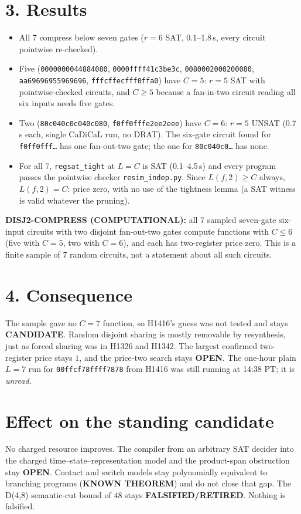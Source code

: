 \documentclass[11pt]{article}
\begin{document}
\section*{3. Results}
\begin{itemize}
\item All 7 compress below seven gates ($r=6$ SAT, 0.1--1.8\,s, every circuit pointwise re-checked).
\item Five (\texttt{0000000044884080}, \texttt{0000ffff41c3be3c}, \texttt{0080002000200080}, \texttt{aa69696955969696}, \texttt{fffcffecfff0ffa0}) have $C=5$: $r=5$ SAT with pointwise-checked circuits, and $C\ge5$ because a fan-in-two circuit reading all six inputs needs five gates.
\item Two (\texttt{80c040c0c040c080}, \texttt{f0ff0fffe2ee2eee}) have $C=6$: $r=5$ UNSAT (0.7\,s each, single CaDiCaL run, no DRAT). The six-gate circuit found for \texttt{f0ff0fff\ldots} has one fan-out-two gate; the one for \texttt{80c040c0\ldots} has none.
\item For all 7, \texttt{regsat\_tight} at $L=C$ is SAT (0.1--4.5\,s) and every program passes the pointwise checker \texttt{resim\_indep.py}. Since $L(f,2)\ge C$ always, $L(f,2)=C$: price zero, with no use of the tightness lemma (a SAT witness is valid whatever the pruning).
\end{itemize}
\textbf{DISJ2-COMPRESS (COMPUTATIONAL):} all 7 sampled seven-gate six-input circuits with two disjoint fan-out-two gates compute functions with $C\le6$ (five with $C=5$, two with $C=6$), and each has two-register price zero. This is a finite sample of 7 random circuits, not a statement about all such circuits.
\section*{4. Consequence}
The sample gave no $C=7$ function, so H1416's guess was not tested and stays \textbf{CANDIDATE}. Random disjoint sharing is mostly removable by resynthesis, just as forced sharing was in H1326 and H1342. The largest confirmed two-register price stays $1$, and the price-two search stays \textbf{OPEN}. The one-hour plain $L=7$ run for \texttt{00ffcf78ffff7878} from H1416 was still running at 14:38 PT; it is \emph{unread}.
\section*{Effect on the standing candidate}
No charged resource improves. The compiler from an arbitrary SAT decider into the charged time--state--representation model and the product-span obstruction stay \textbf{OPEN}. Contact and switch models stay polynomially equivalent to branching programs (\textbf{KNOWN THEOREM}) and do not close that gap. The D(4,8) semantic-cut bound of $48$ stays \textbf{FALSIFIED/RETIRED}. Nothing is falsified.
\end{document}
